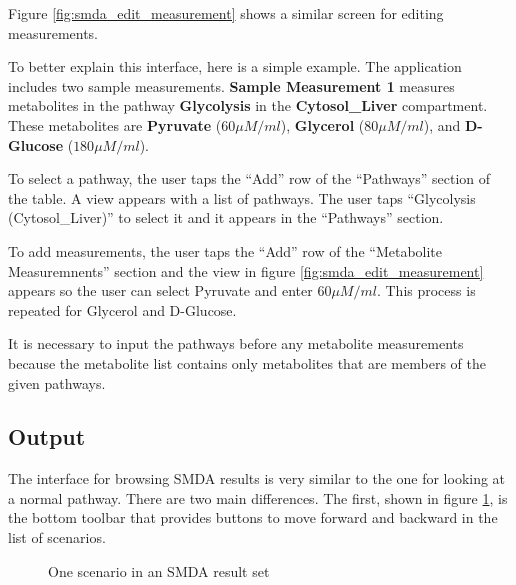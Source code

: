 Figure \ref{fig:smda_edit_measurement} shows a similar screen for editing
measurements.

To better explain this interface, here is a simple example. The application
includes two sample measurements. \textbf{Sample Measurement 1} measures
metabolites in the pathway \textbf{Glycolysis} in the \textbf{Cytosol\_Liver}
compartment. These metabolites are \textbf{Pyruvate} ($60 \mu M/ml$),
\textbf{Glycerol} ($80 \mu M/ml$), and \textbf{D-Glucose} ($180 \mu M/ml$).

To select a pathway, the user taps the ``Add'' row of the ``Pathways'' section
of the table. A view appears with a list of pathways. The user taps ``Glycolysis
(Cytosol_Liver)'' to select it and it appears in the ``Pathways'' section.

To add measurements, the user taps the ``Add'' row of the ``Metabolite
Measuremnents'' section and the view in figure \ref{fig:smda_edit_measurement}
appears so the user can select Pyruvate and enter $60 \mu M/ml$. This process is
repeated for Glycerol and D-Glucose.

It is necessary to input the pathways before any metabolite measurements because
the metabolite list contains only metabolites that are members of the given
pathways.

\subsection{Output}
\label{sect:smda_interface_output}

The interface for browsing SMDA results is very similar to the one for looking
at a normal pathway. There are two main differences. The first, shown in figure
\ref{fig:smda_results}, is the bottom toolbar that provides buttons to move
forward and backward in the list of scenarios.

\begin{figure}[htb]
    \caption{\label{fig:smda_results} One scenario in an SMDA result set}
\end{figure}

